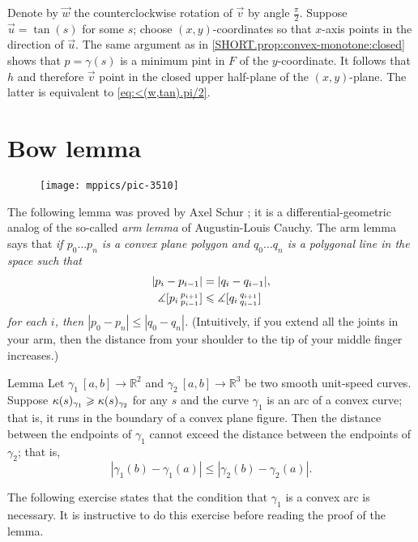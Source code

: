 Denote by $\vec w$ the counterclockwise rotation of $\vec v$ by angle $\tfrac\pi 2$.
Suppose $\vec u=\tan (s)$ for some $s$;
choose $(x,y)$-coordinates so that $x$-axis points in the direction of $\vec u$.
The same argument as in \ref{SHORT.prop:convex-monotone:closed} shows that 
$p=\gamma(s)$ is a minimum pint in $F$ of the $y$-coordinate.
It follows that $h$ and therefore $\vec v$ point in the closed upper half-plane of the $(x,y)$-plane.
The latter is equivalent to \ref{eq:<(w,tan).pi/2}.
\qeds

\section{Bow lemma}

\begin{wrapfigure}{r}{39 mm}
\vskip-4mm
\centering
\texttt{[image: mppics/pic-3510]}
\vskip0mm
\end{wrapfigure}

The following lemma was proved by Axel Schur \cite{shur};
it is a differential-geometric analog of the so-called {}\emph{arm lemma} of Augustin-Louis Cauchy.
The arm lemma says that 
\textit{if $p_0\dots p_n$ is a convex plane polygon and $q_0\dots q_n$ is a polygonal line in the space such that 
\begin{align*}
|p_i-p_{i-1}|&=|q_i-q_{i-1}|,
\\
\measuredangle[p_i\,{}^{p_{i+1}}_{p_{i-1}}]&\leqslant \measuredangle[q_i\,{}^{q_{i+1}}_{q_{i-1}}]
\end{align*}
for each $i$, then $|p_0-p_n|\le |q_0-q_n|$.}
(Intuitively, if you extend all the joints in your arm, then the distance from your shoulder to the tip of your middle finger increases.) 

\begin{thm}{Lemma}\label{lem:bow}
Let $\gamma_1\:[a,b]\to\mathbb{R}^2$ and $\gamma_2\:[a,b] \to\mathbb{R}^3$ be two smooth unit-speed curves.
Suppose $\kappa(s)_{\gamma_1}\geqslant\kappa(s)_{\gamma_2}$ for any $s$ 
and the curve
$\gamma_1$ is an arc of a convex curve; that is, it runs in the boundary of a convex plane figure.
Then the distance between the endpoints of $\gamma_1$ cannot exceed the  distance between the endpoints of $\gamma_2$; that is,
\[|\gamma_1(b)-\gamma_1(a)|\le |\gamma_2(b)-\gamma_2(a)|.\]

\end{thm}

The following exercise states that the condition that $\gamma_1$ is a convex arc is necessary.
It is instructive to do this exercise before reading the proof of the lemma.

